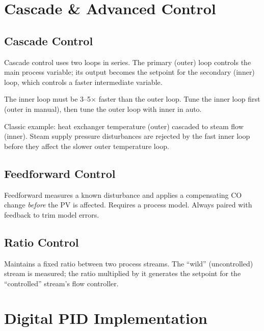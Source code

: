 \documentclass[12pt,twoside,openright]{memoir}
\begin{document}
\chapter{Cascade \& Advanced Control}

\section{Cascade Control}

Cascade control uses two loops in series. The primary (outer) loop controls the main process variable; its output becomes the setpoint for the secondary (inner) loop, which controls a faster intermediate variable.

\begin{keyconcept}
The inner loop must be 3--5$\times$ faster than the outer loop. Tune the inner loop first (outer in manual), then tune the outer loop with inner in auto.
\end{keyconcept}

Classic example: heat exchanger temperature (outer) cascaded to steam flow (inner). Steam supply pressure disturbances are rejected by the fast inner loop before they affect the slower outer temperature loop.

\section{Feedforward Control}

Feedforward measures a known disturbance and applies a compensating CO change \emph{before} the PV is affected. Requires a process model. Always paired with feedback to trim model errors.

\section{Ratio Control}

Maintains a fixed ratio between two process streams. The ``wild'' (uncontrolled) stream is measured; the ratio multiplied by it generates the setpoint for the ``controlled'' stream's flow controller.

\chapter{Digital PID Implementation}
\end{document}

